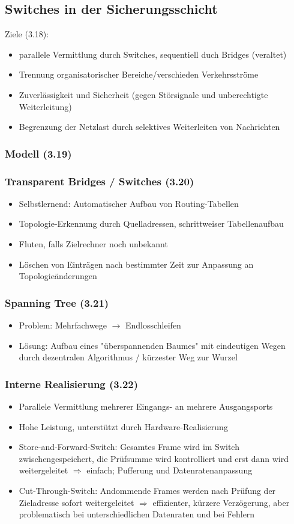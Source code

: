 \subsection{Switches in der Sicherungsschicht}
Ziele (3.18):
\begin{itemize}
	\item parallele Vermittlung durch Switches, sequentiell duch Bridges (veraltet)
	\item Trennung organisatorischer Bereiche/verschieden Verkehrsströme
	\item Zuverlässigkeit und Sicherheit (gegen Störsignale und unberechtigte Weiterleitung)
	\item Begrenzung der Netzlast durch selektives Weiterleiten von Nachrichten
\end{itemize}
\subsubsection{Modell (3.19)}
\subsubsection{Transparent Bridges / Switches (3.20)}
\begin{itemize}
	\item Selbstlernend: Automatischer Aufbau von Routing-Tabellen
	\item Topologie-Erkennung durch Quelladressen, schrittweiser Tabellenaufbau
	\item Fluten, falls Zielrechner noch unbekannt
	\item Löschen von Einträgen nach bestimmter Zeit zur Anpassung an Topologieänderungen
\end{itemize}
\subsubsection{Spanning Tree (3.21)}
\begin{itemize}
	\item Problem: Mehrfachwege \(\to\) Endlosschleifen
	\item Lösung: Aufbau eines "überspannenden Baumes" mit eindeutigen Wegen durch dezentralen Algorithmus / kürzester Weg zur Wurzel
\end{itemize}
\subsubsection{Interne Realisierung (3.22)}
\begin{itemize}
	\item Parallele Vermittlung mehrerer Eingangs- an mehrere Ausgangsports
	\item Hohe Leistung, unterstützt durch Hardware-Realisierung
	\item Store-and-Forward-Switch: Gesamtes Frame wird im Switch zwischengespeichert, die Prüfsumme wird kontrolliert und erst dann wird weitergeleitet \(\Rightarrow\) einfach; Pufferung und Datenratenanpassung
	\item Cut-Through-Switch: Andommende Frames werden nach Prüfung der Zieladresse sofort weitergeleitet \(\Rightarrow\) effizienter, kürzere Verzögerung, aber problematisch bei unterschiedlichen Datenraten und bei Fehlern
\end{itemize}
